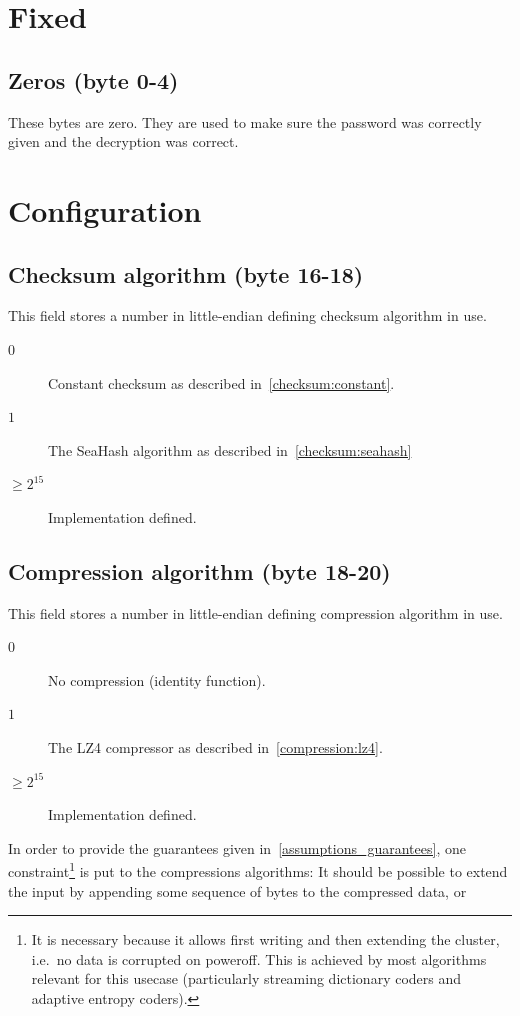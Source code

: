 \documentclass[11pt,a4paper]{report}
\begin{document}
    \section{Fixed}
        \subsection{Zeros (byte 0-4)}
        These bytes are zero. They are used to make sure the password was
        correctly given and the decryption was correct.

    \section{Configuration}
        \subsection{Checksum algorithm (byte 16-18)}
        \label{config:checksum}
        This field stores a number in little-endian defining checksum algorithm
        in use.

        \begin{description}
            \item [$0$] Constant checksum as described
                in~\ref{checksum:constant}.
            \item [$1$] The SeaHash algorithm as described
                in~\ref{checksum:seahash}
            \item [$\geq 2^{15}$] Implementation defined.
        \end{description}

        \subsection{Compression algorithm (byte 18-20)}
        \label{config:compression}
        This field stores a number in little-endian defining compression
        algorithm in use.

        \begin{description}
            \item [$0$] No compression (identity function).
            \item [$1$] The LZ4 compressor as described
                in~\ref{compression:lz4}.
            \item [$\geq 2^{15}$] Implementation defined.
        \end{description}

        In order to provide the guarantees given
        in~\ref{assumptions_guarantees}, one constraint\footnote{It is
        necessary because it allows first writing and then extending the
        cluster, i.e.\ no data is corrupted on poweroff.  This is achieved
        by most algorithms relevant for this usecase (particularly
        streaming dictionary coders and adaptive entropy coders).} is put to
        the compressions algorithms: It should be possible to extend the input
        by appending some sequence of bytes to the compressed data, or
\end{document}
